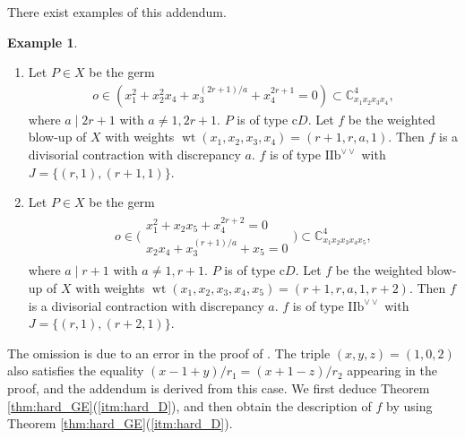 \documentclass[a4paper,11pt]{amsart}
\theoremstyle{definition}
\newtheorem*{example*}{Example}
\theoremstyle{remark}
\numberwithin{equation}{section}
\newcommand{\bC}{{\mathbb C}}
\newcommand{\wt}{\operatorname{wt}}
\begin{document}
There exist examples of this addendum.

\begin{example*}
\begin{enumerate}
\item
Let $P \in X$ be the germ
\begin{align*}
o \in (x_1^2+x_2^2x_4+x_3^{(2r+1)/a}+x_4^{2r+1}=0)
\subset \bC^4_{x_1x_2x_3x_4},
\end{align*}
where $a \mid 2r+1$ with $a \neq 1,2r+1$.
$P$ is of type c$D$.
Let $f$ be the weighted blow-up of $X$
with weights $\wt(x_1,x_2,x_3,x_4)=(r+1,r,a,1)$.
Then $f$ is a divisorial contraction with discrepancy $a$.
$f$ is of type ${\textrm{IIb}}^{\vee\vee}$ with $J=\{(r,1),(r+1,1)\}$.
\item
Let $P \in X$ be the germ
\begin{align*}
o \in \bigg(
\begin{array}{c}
x_1^2+x_2x_5+x_4^{2r+2}=0 \\
x_2x_4+x_3^{(r+1)/a}+x_5=0
\end{array}
\bigg)
\subset \bC^4_{x_1x_2x_3x_4x_5},
\end{align*}
where $a \mid r+1$ with $a \neq 1,r+1$.
$P$ is of type c$D$.
Let $f$ be the weighted blow-up of $X$
with weights $\wt(x_1,x_2,x_3,x_4,x_5)=(r+1,r,a,1,r+2)$.
Then $f$ is a divisorial contraction with discrepancy $a$.
$f$ is of type ${\textrm{IIb}}^{\vee\vee}$ with $J=\{(r,1),(r+2,1)\}$.
\end{enumerate}
\end{example*}

The omission is due to an error in the proof of \cite[Lemma 3.14]{Ka03}.
The triple $(x,y,z)=(1,0,2)$ also satisfies the equality
$(x-1+y)/r_1=(x+1-z)/r_2$ appearing in the proof,
and the addendum is derived from this case.
We first deduce Theorem \ref{thm:hard_GE}(\ref{itm:hard_D}),
and then obtain the description of $f$
by using Theorem \ref{thm:hard_GE}(\ref{itm:hard_D}).
\end{document}
